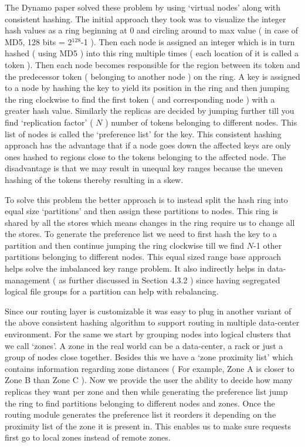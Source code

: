\documentclass[10pt,twocolumn,preprint,natbib,authoryear]{sigplanconf}
\begin{document}
The Dynamo paper solved these problem by using `virtual nodes' along with consistent hashing. The initial approach they took was to visualize the integer hash values as a ring beginning at 0 and circling around to max value ( in case of MD5, 128 bits = 2$^{128}$-1 ). Then each node is assigned an integer which is in turn hashed ( using MD5 ) into this ring multiple times ( each location of it is called a token ). Then each node becomes responsible for the region between its token and the predecessor token ( belonging to another node ) on the ring. A key is assigned to a node by hashing the key to yield its position in the ring and then jumping the ring clockwise to find the first token ( and corresponding node ) with a greater hash value. Similarly the replicas are decided by jumping further till you find `replication factor' ( $N$ ) number of tokens belonging to different nodes. This list of nodes is called the `preference list' for the key. This consistent hashing approach has the advantage that if a node goes down the affected keys are only ones hashed to regions close to the tokens belonging to the affected node. The disadvantage is that we may result in unequal key ranges because the uneven hashing of the tokens thereby resulting in a skew. 

To solve this problem the better approach is to instead split the hash ring into equal size `partitions' and then assign these partitions to nodes. This ring is shared by all the stores which means changes in the ring require us to change all the stores. To generate the preference list we need to first hash the key to a partition and then continue jumping the ring clockwise till we find $N$-1 other partitions belonging to different nodes. This equal sized range base approach helps solve the imbalanced key range problem. It also indirectly helps in data-management ( as further discussed in Section 4.3.2 ) since having segregated logical file groups for a partition can help with rebalancing. 

Since our routing layer is customizable it was easy to plug in another variant of the above consistent hashing algorithm to support routing in multiple data-center environment. For the same we start by grouping nodes into logical clusters that we call `zones'. A zone in the real world can be a data-center, a rack or just a group of nodes close together. Besides this we have a `zone proximity list' which contains information regarding zone distances ( For example, Zone A is closer to Zone B than Zone C ). Now we provide the user the ability to decide how many replicas they want per zone and then while generating the preference list jump the ring to find partitions belonging to different nodes and zones. Once the routing module generates the preference list it reorders it depending on the proximity list of the zone it is present in. This enables us to make sure requests first go to local zones instead of remote zones. 
\end{document}
